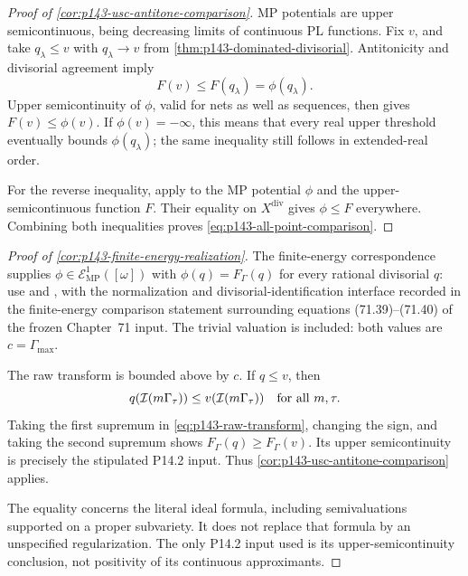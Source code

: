\begin{proof}[Proof of \cref{cor:p143-usc-antitone-comparison}]
MP potentials are upper semicontinuous, being decreasing limits of
continuous PL functions. Fix \(v\), and take \(q_\lambda\leq v\)
with \(q_\lambda\to v\) from \cref{thm:p143-dominated-divisorial}.
Antitonicity and divisorial agreement imply
\[
                         F(v)\leq F(q_\lambda)=\phi(q_\lambda).
\]
Upper semicontinuity of \(\phi\), valid for nets as well as sequences,
then gives \(F(v)\leq\phi(v)\). If \(\phi(v)=-\infty\), this means
that every real upper threshold eventually bounds \(\phi(q_\lambda)\);
the same inequality still follows in extended-real order.

For the reverse inequality, apply
\cite[Theorem~4.3.8]{MP24} to the MP potential \(\phi\) and the
upper-semicontinuous function \(F\). Their equality on
\(X^{\mathrm{div}}\) gives \(\phi\leq F\) everywhere.
Combining both inequalities proves
\eqref{eq:p143-all-point-comparison}.
\end{proof}

\begin{proof}[Proof of \cref{cor:p143-finite-energy-realization}]
The finite-energy correspondence supplies
\(\phi\in\mathcal E^1_{\mathrm{MP}}([\omega])\) with
\(\phi(q)=F_\Gamma(q)\) for every rational divisorial \(q\):
use \cite[Theorem~3.17]{DXZ23} and
\cite[Theorems~5.1.4, 5.1.7 and Section~5.2]{MP24}, with the
normalization and divisorial-identification interface recorded in the
finite-energy comparison statement surrounding equations
\textup{(71.39)}--\textup{(71.40)} of the frozen Chapter~71 input.
The trivial valuation is included: both values are
\(c=\Gamma_{\max}\).

The raw transform is bounded above by \(c\). If \(q\leq v\), then
\[
 q(\mathcal I(m\Gamma_\tau))
       \leq v(\mathcal I(m\Gamma_\tau))
 \quad\hbox{for all }m,\tau.
\]
Taking the first supremum in \eqref{eq:p143-raw-transform}, changing
the sign, and taking the second supremum shows
\(F_\Gamma(q)\geq F_\Gamma(v)\).
Its upper semicontinuity is precisely the stipulated P14.2 input.
Thus \cref{cor:p143-usc-antitone-comparison} applies.

The equality concerns the literal ideal formula, including
semivaluations supported on a proper subvariety. It does not replace
that formula by an unspecified regularization. The only P14.2 input
used is its upper-semicontinuity conclusion, not positivity of its
continuous approximants.
\end{proof}
